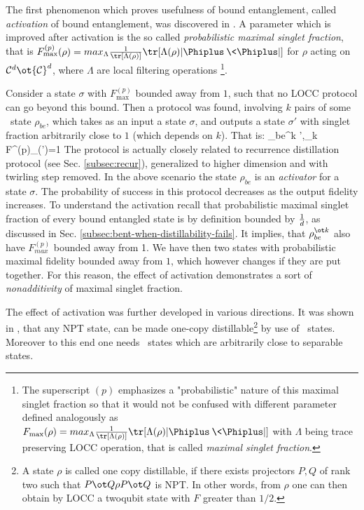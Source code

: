 \documentclass[twocolumn,aps,rmp]{revtex4}
\begin{document}
The first phenomenon which proves usefulness of bound entanglement,
called {\it activation} of bound entanglement, was discovered in
\cite{activation}. A parameter which is improved after activation is
the so called {\it probabilistic maximal singlet fraction}, that is
$F^{(p)}_{\max}(\rho)= max_{\Lambda}\frac{1}{{\tr}[\Lambda(\rho)]}{\tr}[\Lambda(\rho)|\Phiplus\>\<\Phiplus|]$
for $\rho$ acting on ${\cal C}^{d}\ot{\cal C}^{d}$,  where $\Lambda$ are
local filtering operations
\footnote{The superscript $(p)$ emphasizes a "probabilistic" nature of this maximal singlet fraction so that it would not  be confused with different parameter defined analogously as
$F_{\max}(\rho)=max_{\Lambda}\frac{1}{{\tr}[\Lambda(\rho)]}{\tr}[\Lambda(\rho)
|\Phiplus\>\<\Phiplus|]$ with $\Lambda$ being trace preserving LOCC operation, that is called {\it maximal
singlet fraction}.}.

Consider a state $\sigma$ with $F^{(p)}_{\max}$ bounded away
from $1$, such that no LOCC protocol can go beyond this bound.  Then a
protocol was found, involving $k$ pairs of some \bent\ state
$\rho_{be}$, which takes as an input a state $\sigma$, and outputs a
state $\sigma'$ with singlet fraction arbitrarily close to $1$ (which
depends on $k$). That is: \be \rho_{be}^{\ot k}\ot\sigma
\longrightarrow \sigma',\quad \lim_k F^{(p)}_{\max}(\sigma')=1 \ee The
protocol is actually closely related to recurrence distillation
protocol (see Sec. \ref{subsec:recur}), generalized to higher
dimension and with twirling step removed. In the above scenario the
state $\rho_{be}$ is an {\it activator} for a state $\sigma$. The
probability of success in this protocol decreases as the output
fidelity increases. To understand the activation recall that probabilistic maximal singlet fraction of every bound entangled state is by definition
bounded by ${1\over d}$, as discussed in
Sec. \ref{subsec:bent-when-distillability-fails}. It implies, that $\rho_{be}^{\ot k}$ also have $F^{(p)}_{max}$ bounded away from 1. We have then two states with probabilistic maximal fidelity bounded away from $1$, which however changes if they are put together. For this reason, the effect of activation demonstrates a sort of {\it nonadditivity} of maximal singlet fraction.


The effect of activation was further developed in various
directions. It was shown in \cite{VollbWolf_activation}, that any NPT
state, can be made one-copy distillable\footnote{A state $\rho$ is
  called one copy distillable, if there exists projectors $P,Q$ of
  rank two such that $P\ot Q \rho P\ot Q$ is NPT. In other words, from
  $\rho$ one can then obtain by LOCC a twoqubit state with $F$ greater
  than $1/2$.} by use of \bent\ states.  Moreover to this end one
needs \bent\ states which are arbitrarily close to separable states.
\end{document}
